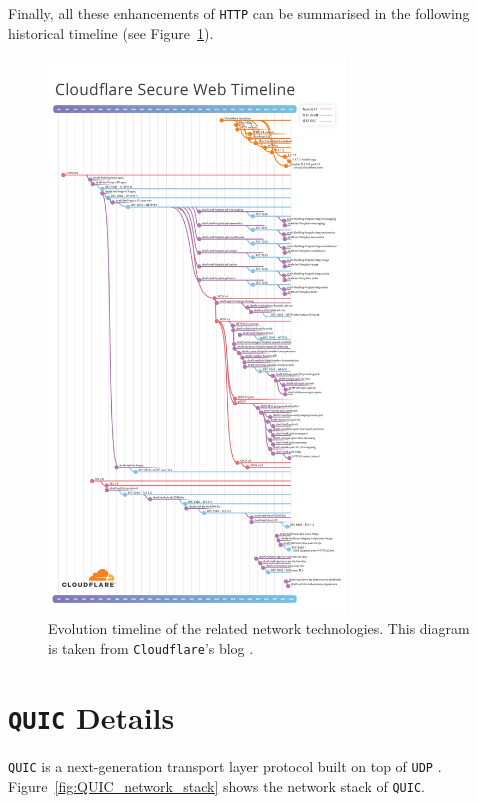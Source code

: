 \documentclass[12pt,a4paper,twoside,openright]{report}
\begin{document}
Finally, all these enhancements of \texttt{HTTP} can be summarised in the following historical timeline (see Figure~\ref{fig:cf-secure-web-timeline}).
    \begin{figure}[H]
    \centering
    \includegraphics[width=0.7\textwidth]{figs/cf-secure-web-timeline-1.png}
    \caption{Evolution timeline of the related network technologies. This diagram is taken from \texttt{Cloudflare}'s blog \cite{http-3-from-root-to-tip}.}
    \label{fig:cf-secure-web-timeline}
    \end{figure}




\section{\texttt{QUIC} Details} \label{QUIC_details_section}

\texttt{QUIC} is a next-generation transport layer protocol built on top of \texttt{UDP} \cite{chromium_blog_about_quic}.
Figure~\ref{fig:QUIC_network_stack} shows the network stack of \texttt{QUIC}.
\end{document}
